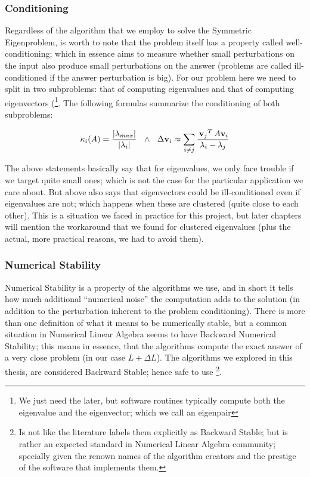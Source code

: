 \subsubsection{Conditioning}
Regardless of the algorithm that we employ to solve the Symmetric
Eigenproblem, is worth to note that the problem itself has a property
called well-conditioning; which in essence aims to measure whether small
perturbations on the input also produce small perturbations on the
answer (problems are called ill-conditioned if the answer perturbation
is big). For our problem here we need to split in two subproblems:
that of computing eigenvalues and that of computing eigenvectors (\footnote{We
just need the later, but software routines typically compute both the
eigenvalue and the eigenvector; which we call an eigenpair}. The
following formulas summarize the conditioning of both subproblems:

\begin{equation*}
    \kappa_{i}(A) = \dfrac{\left\lvert \lambda_{max} \right\vert}{\left\lvert \lambda_i \right\vert}
    \,\,\,\,\land\,\,\,\,
    \Delta \mathbf{v}_i \approx \sum\limits_{\tiny{i \ne j}}
    \dfrac{\,{\mathbf{v}_j}^{T}\, A \mathbf{v}_i}{\lambda_i - \lambda_j}  
\end{equation*}
\joinbelow{1cm}

The above statements basically say that for eigenvalues, we only face
trouble if we target quite small ones; which is not the case for the
particular application we care about. But above also says that
eigenvectors could be ill-conditioned even if eigenvalues are not;
which happens when these are clustered (quite close to each
other). This is a situation we faced in practice for this project, but
later chapters will mention the workaround that we found for clustered
eigenvalues (plus the actual, more practical reasons, we had to avoid them).

\subsubsection{Numerical Stability}

Numerical Stability is a property of the algorithms we use, and in
short it tells how much additional ``numerical noise'' the computation
adds to the solution (in addition to the perturbation inherent to the
problem conditioning). There is more than one definition of what it
means to be numerically stable, but a common situation in Numerical
Linear Algebra seems to have Backward Numerical Stability; this means
in essence, that the algorithms compute the exact answer of a very
close problem (in our case $L + \Delta L$). The algorithms we explored 
in this thesis, are considered Backward Stable; hence safe to
use \footnote{Is not like the literature labels them explicitly as Backward
  Stable; but is rather an expected standard in Numerical Linear
  Algebra community; specially given the renown names of the algorithm
creators and the prestige of the software that implements them.}. \\

